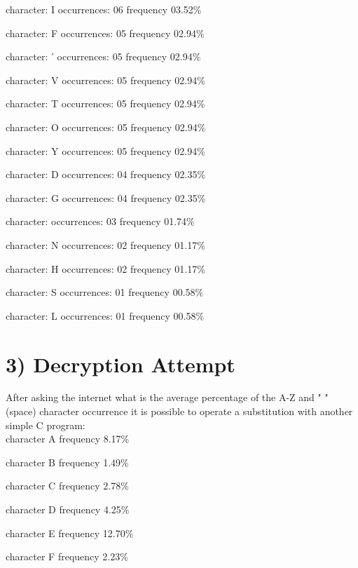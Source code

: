 \documentclass{article}
\begin{document}
character: I occurrences: 06 frequency 03.52\%

character: F occurrences: 05 frequency 02.94\%

character: ' occurrences: 05 frequency 02.94\%

character: V occurrences: 05 frequency 02.94\%

character: T occurrences: 05 frequency 02.94\%

character: O occurrences: 05 frequency 02.94\%

character: Y occurrences: 05 frequency 02.94\%

character: D occurrences: 04 frequency 02.35\%

character: G occurrences: 04 frequency 02.35\%

character:   occurrences: 03 frequency 01.74\%

character: N occurrences: 02 frequency 01.17\%

character: H occurrences: 02 frequency 01.17\%

character: S occurrences: 01 frequency 00.58\%

character: L occurrences: 01 frequency 00.58\%



\section*{3) Decryption Attempt}
After asking the internet what is the average percentage of the A-Z and " " (space) character occurrence it is possible to operate a substitution with another simple C program:\\

character A frequency 8.17\%

character B frequency 1.49\%

character C frequency 2.78\%

character D frequency 4.25\%

character E frequency 12.70\%

character F frequency 2.23\%
\end{document}
